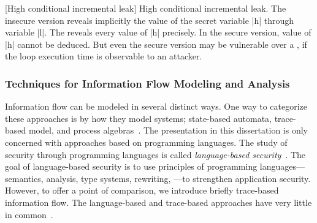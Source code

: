 \begin{center}
 \captionsetup{type=lstlisting}
 \begin{minipage}{.45\textwidth}
  \begin{center}\end{center}
 \end{minipage}\hfill
 \begin{minipage}{.45\textwidth}
  \begin{center}\end{center}
 \end{minipage}
 [High conditional incremental leak]{
  High conditional incremental leak. The insecure version reveals
  implicitly the value of the secret variable
  \pr|h| through variable \pr|l|. The  reveals
  every value of \pr|h| precisely. In the secure version, value of \pr|h| cannot
  be deduced. But even the secure version may be vulnerable over a , if the loop execution time is observable to an attacker.
}\label{lst:hi-cond}\end{center}

\subsubsection{Techniques for Information Flow Modeling and Analysis}
\label{if-techniques}

Information flow can be modeled in several distinct ways.
One way to categorize these approaches is by how they model systems;
\eg state-based automata, trace-based model, and process algebras~\cite{vandermeyden2007}.
The presentation in this dissertation is only concerned with approaches based on programming languages.
The study of security through programming languages is called 
{\emph{language-based security}}~\cite{schneider2001,sabelfeld2003}.
The goal of {language-based security} is to use principles of programming languages---semantics, analysis, type systems, rewriting, \etc---to strengthen application security.
However, to offer a point of comparison, we introduce briefly trace-based information flow.
The language-based and trace-based approaches have very little in common~\cite[p. 235]{eggert2014}.

